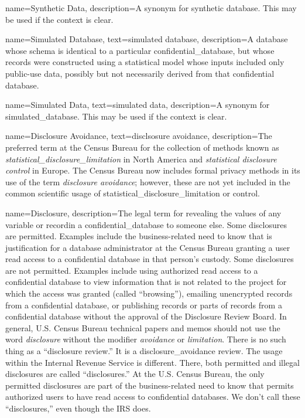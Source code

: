 {
    name=Synthetic Data,
    description={A synonym for synthetic database. This may be used if the context is clear.}
}

{
    name=Simulated Database,
    text=simulated database,
    description={A \gls{database} whose schema is identical to a particular \gls{confidential_database}, but whose \glspl{record} were constructed using a statistical model whose inputs included only public-use data, possibly but not necessarily derived from that confidential database.}
}

{
    name=Simulated Data,
    text=simulated data,
    description={A synonym for \gls{simulated_database}. This may be used if the context is clear.}
}

{
    name=Disclosure Avoidance,
    text=disclsosure avoidance,
    description={The preferred term at the Census Bureau for the collection of methods known as \emph{\gls{statistical_disclosure_limitation}} in North America and \emph{statistical disclosure control} in Europe. The Census Bureau now includes formal privacy methods in its use of the term \textit{disclosure avoidance}; however, these are not yet included in the common scientific usage of \gls{statistical_disclosure_limitation} or control.}
}

{
    name=Disclosure,
    description={The legal term for revealing the values of any variable or \gls{record}in a \gls{confidential_database} to someone else. Some disclosures are permitted. Examples include the business-related need to know that is justification for a database administrator at the Census Bureau granting a user read access to a confidential database in that person's custody. \newline \newline Some disclosures are not permitted. Examples include using authorized read access to a confidential database to view information that is not related to the project for which the access was granted (called ``browsing''), emailing unencrypted \glspl{record} from a confidential database, or publishing records or parts of records from a confidential database without the approval of the Disclosure Review Board. In general, U.S. Census Bureau technical papers and memos should not use the word \textit{disclosure} without the modifier \textit{avoidance} or \textit{limitation}. There is no such thing as a ``disclosure review.'' It is a \gls{disclosure_avoidance} review. The usage within the Internal Revenue Service is different. There, both permitted and illegal disclosures are called ``disclosures.'' At the U.S. Census Bureau, the only permitted disclosures are part of the business-related need to know that permits authorized users to have read access to confidential databases. We don't call these ``disclosures,'' even though the IRS does.}
}

